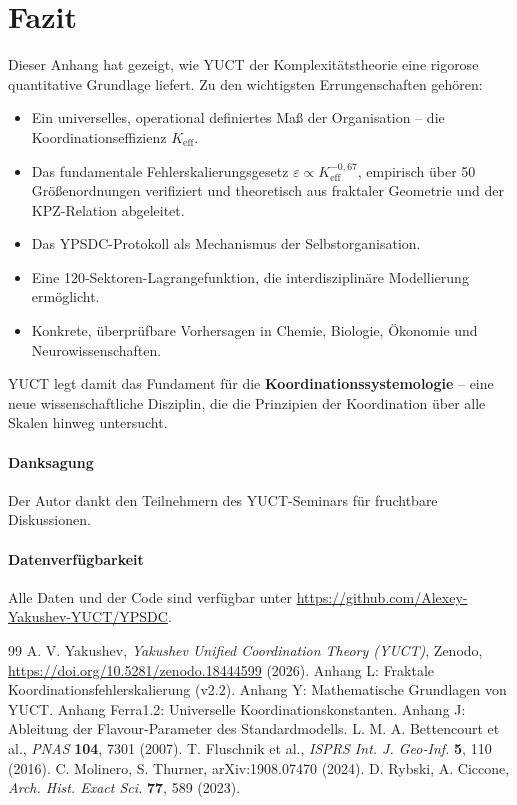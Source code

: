\documentclass[11pt]{article}
\theoremstyle{remark}
\newcommand{\Keff}{K_{\mathrm{eff}}}
\begin{document}
	\section{Fazit}
	\label{sec:conclusion}
	
	Dieser Anhang hat gezeigt, wie YUCT der Komplexitätstheorie eine rigorose quantitative Grundlage liefert. Zu den wichtigsten Errungenschaften gehören:
	\begin{itemize}
		\item Ein universelles, operational definiertes Maß der Organisation – die Koordinationseffizienz \(\Keff\).
		\item Das fundamentale Fehlerskalierungsgesetz \(\varepsilon \propto \Keff^{-0,67}\), empirisch über 50 Größenordnungen verifiziert und theoretisch aus fraktaler Geometrie und der KPZ-Relation abgeleitet.
		\item Das YPSDC-Protokoll als Mechanismus der Selbstorganisation.
		\item Eine 120‑Sektoren-Lagrangefunktion, die interdisziplinäre Modellierung ermöglicht.
		\item Konkrete, überprüfbare Vorhersagen in Chemie, Biologie, Ökonomie und Neurowissenschaften.
	\end{itemize}
	
	YUCT legt damit das Fundament für die \textbf{Koordinationssystemologie} – eine neue wissenschaftliche Disziplin, die die Prinzipien der Koordination über alle Skalen hinweg untersucht.
	
	\paragraph*{Danksagung}
	Der Autor dankt den Teilnehmern des YUCT-Seminars für fruchtbare Diskussionen.
	
	\paragraph*{Datenverfügbarkeit}
	Alle Daten und der Code sind verfügbar unter \url{https://github.com/Alexey-Yakushev-YUCT/YPSDC}.
	
	\begin{thebibliography}{99}
		 A. V. Yakushev, \emph{Yakushev Unified Coordination Theory (YUCT)}, Zenodo, \url{https://doi.org/10.5281/zenodo.18444599} (2026).
		 Anhang L: Fraktale Koordinationsfehlerskalierung (v2.2).
		 Anhang Y: Mathematische Grundlagen von YUCT.
		 Anhang Ferra1.2: Universelle Koordinationskonstanten.
		 Anhang J: Ableitung der Flavour-Parameter des Standardmodells.
		 L. M. A. Bettencourt et al., \emph{PNAS} \textbf{104}, 7301 (2007).
		 T. Fluschnik et al., \emph{ISPRS Int. J. Geo‑Inf.} \textbf{5}, 110 (2016).
		 C. Molinero, S. Thurner, arXiv:1908.07470 (2024).
		 D. Rybski, A. Ciccone, \emph{Arch. Hist. Exact Sci.} \textbf{77}, 589 (2023).
	\end{thebibliography}
	
\end{document}

